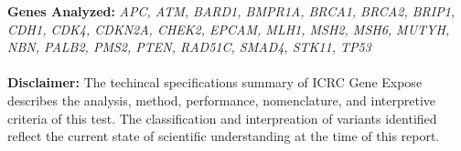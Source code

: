 \documentclass[11pt]{article}\usepackage[]{graphicx}\usepackage[]{color}
\begin{document}
\noindent
{}
\textbf{Genes Analyzed:} \textit{APC, ATM, BARD1, BMPR1A, BRCA1, BRCA2, BRIP1, CDH1, CDK4, CDKN2A, CHEK2, EPCAM, MLH1, MSH2, MSH6, MUTYH, NBN, PALB2, PMS2, PTEN, RAD51C, SMAD4, STK11, TP53} \\ 
\\
\textbf{Disclaimer:} The techincal specifications summary of ICRC Gene Expose describes the analysis, method, performance, nomenclature, and interpretive criteria of this test. The classification and interpreation of variants identified reflect the current state of scientific understanding at the time of this report. \\
\end{document}
